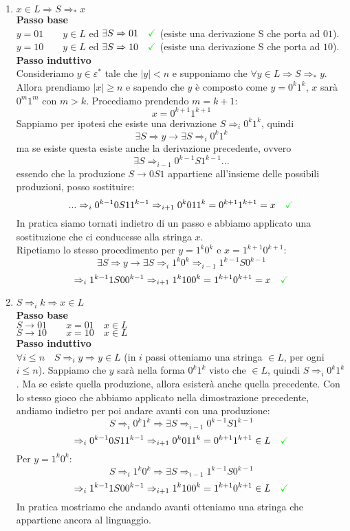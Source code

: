 \documentclass[a4paper,oneside]{scrbook}
\newcommand{\greenmark}{\quad \textcolor{green}{\checkmark}}
\begin{document}
\begin{enumerate}
	\item $x\in L \Rightarrow S \Rightarrow_* x $\\
	\textbf{Passo base}\\
	$y=01 \qquad y \in L$ ed $\exists S\Rightarrow 01 \greenmark $ (esiste una derivazione S che porta ad $01$).\\		$y=10 \qquad y \in L$ ed $\exists S\Rightarrow 10 \greenmark $ (esiste una derivazione S che porta ad $10$).\\
	\textbf{Passo induttivo}\\
	Consideriamo $y \in \varepsilon^*$ tale che $|y|<n$ e supponiamo che $\forall y \in L \Rightarrow S \Rightarrow_* y$.\\
	Allora prendiamo $|x|\geq n$ e sapendo che $y$ è composto come $y=0^k1^k$, $x$ sarà $0^m1^m$ con $m>k$. Procediamo prendendo $m=k+1$:
	$$ x=0^{k+1}1^{k+1}$$
	Sappiamo per ipotesi che esiste una derivazione  $S\Rightarrow_i 0^k1^k$, quindi
	$$\exists S \Rightarrow y \rightarrow \exists S \Rightarrow_i 0^k1^k$$
	ma se esiste questa esiste anche la derivazione precedente, ovvero
	$$\exists S \Rightarrow_{i-1} 0^{k-1}S1^{k-1} ...$$
	essendo che la produzione $S\rightarrow 0S1$ appartiene all'insieme delle possibili produzioni, posso sostituire:
	$$... \Rightarrow_i 0^{k-1}0S11^{k-1} \Rightarrow_{i+1} 0^k011^k = 0^{k+1}1^{k+1} = x \greenmark$$
	In pratica siamo tornati indietro di un passo e abbiamo applicato una sostituzione che ci conducesse alla stringa $x$.\\
	Ripetiamo lo stesso procedimento per $y=1^k0^k$ e $x=1^{k+1}0^{k+1}$:
	$$\exists S \Rightarrow y \rightarrow \exists S \Rightarrow_i 1^k0^k \Rightarrow_{i-1} 1^{k-1}S0^{k-1}$$
	$$\Rightarrow_i 1^{k-1}1S00^{k-1} \Rightarrow_{i+1} 1^k100^k = 1^{k+1}0^{k+1} = x \greenmark$$
	
	\item $ S \Rightarrow_i k \Rightarrow x \in L$\\
	\textbf{Passo base}\\
	$S\rightarrow 01 \qquad x=01 \quad x \in L$\\
	$S\rightarrow 10 \qquad x=10 \quad x \in L$\\
	\textbf{Passo induttivo}\\
	$\forall i \leq n \quad S \Rightarrow_i y \Rightarrow y \in L $ (in $i$ passi otteniamo una stringa $\in L$, per ogni $i\leq n$).
	Sappiamo che $y$ sarà nella forma $0^k1^k$ visto che $\in L$, quindi $S \Rightarrow_i 0^k1^k$. Ma se esiste quella produzione, allora
	esisterà anche quella precedente. Con lo stesso gioco che abbiamo applicato nella dimostrazione precedente, andiamo indietro per poi
	andare avanti con una produzione:
	$$S \Rightarrow_i 0^k1^k \Rightarrow \exists S \Rightarrow_{i-1} 0^{k-1}S1^{k-1}$$
	$$\Rightarrow_i 0^{k-1}0S11^{k-1} \Rightarrow_{i+1} 0^k011^k = 0^{k+1}1^{k+1} \in L \greenmark$$
	Per $y=1^k0^k$:
	$$S \Rightarrow_i 1^k0^k \Rightarrow \exists S \Rightarrow_{i-1} 1^{k-1}S0^{k-1}$$
	$$\Rightarrow_i 1^{k-1}1S00^{k-1} \Rightarrow_{i+1} 1^k100^k = 1^{k+1}0^{k+1} \in L \greenmark$$
	In pratica mostriamo che andando avanti otteniamo una stringa che appartiene ancora al linguaggio.
\end{enumerate}
\end{document}
